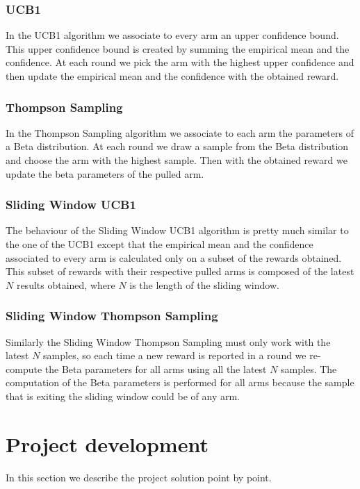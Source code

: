 \documentclass{article}
\begin{document}
\subsubsection{UCB1}
In the UCB1 algorithm we associate to every arm an upper confidence bound. This upper confidence bound is created by summing the empirical mean and the confidence. At each round we pick the arm with the highest upper confidence and then update the empirical mean and the confidence with the obtained reward.

\subsubsection{Thompson Sampling}
In the Thompson Sampling algorithm we associate to each arm the parameters of a Beta distribution. At each round we draw a sample from the Beta distribution and choose the arm with the highest sample. Then with the obtained reward we update the beta parameters of the pulled arm.

\subsubsection{Sliding Window UCB1}
The behaviour of the Sliding Window UCB1 algorithm is pretty much similar to the one of the UCB1 except that the empirical mean and the confidence associated to every arm is calculated only on a subset of the rewards obtained. This subset of rewards with their respective pulled arms is composed of the latest $N$ results obtained, where $N$ is the length of the sliding window.

\subsubsection{Sliding Window Thompson Sampling}
Similarly the Sliding Window Thompson Sampling must only work with the latest $N$ samples, so each time a new reward is reported in a round we re-compute the Beta parameters for all arms using all the latest $N$ samples.
The computation of the Beta parameters is performed for all arms because the sample that is exiting the sliding window could be of any arm.



\section{Project development}
In this section we describe the project solution point by point.
\end{document}
